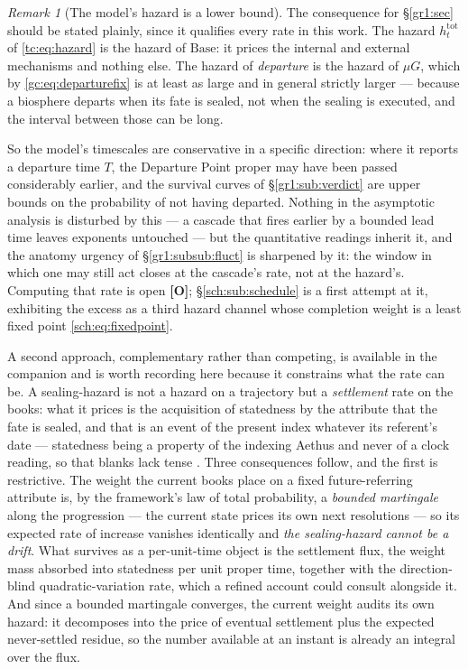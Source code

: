\documentclass[11pt]{article}
\numberwithin{equation}{section}
\theoremstyle{plain}
\theoremstyle{definition}
\theoremstyle{remark}
\newtheorem{remark}[theorem]{Remark}
\begin{document}
\begin{remark}[The model's hazard is a lower bound]
\label{gc:rem:hazardlower}
The consequence for \S\ref{gr1:sec} should be stated plainly, since it
qualifies every rate in this work. The hazard $h^{\mathrm{tot}}_t$ of
\eqref{tc:eq:hazard} is the hazard of $\mathrm{Base}$: it prices the
internal and external mechanisms and nothing else. The hazard of
\emph{departure} is the hazard of $\mu G$, which by
\eqref{gc:eq:departurefix} is at least as large and in general strictly
larger --- because a biosphere departs when its fate is sealed, not
when the sealing is executed, and the interval between those can be
long.

So the model's timescales are conservative in a specific direction:
where it reports a departure time $T$, the Departure Point proper may
have been passed considerably earlier, and the survival curves of
\S\ref{gr1:sub:verdict} are upper bounds on the probability of not
having departed. Nothing in the asymptotic analysis is disturbed by
this --- a cascade that fires earlier by a bounded lead time leaves
exponents untouched --- but the quantitative readings inherit it, and
the anatomy urgency of \S\ref{gr1:subsub:fluct} is sharpened by it: the
window in which one may still act closes at the cascade's rate, not at
the hazard's. Computing that rate is open \textbf{[O]};
\S\ref{sch:sub:schedule} is a first attempt at it, exhibiting the excess
as a third hazard channel whose completion weight is a least fixed point
\eqref{sch:eq:fixedpoint}.

A second approach, complementary rather than competing, is available in
the companion and is worth recording here because it constrains what the
rate can be. A sealing-hazard is not a hazard on a trajectory but a
\emph{settlement} rate on the books: what it prices is the acquisition of
statedness by the attribute that the fate is sealed, and that is an
event of the present index whatever its referent's date --- statedness
being a property of the indexing Aethus and never of a clock reading, so
that blanks lack tense \cite{Aethus, AethusDecision}. Three consequences follow, and the first is
restrictive. The weight the current books place on a fixed
future-referring attribute is, by the framework's law of total
probability, a \emph{bounded martingale} along the progression --- the
current state prices its own next resolutions --- so its expected rate of
increase vanishes identically and \emph{the sealing-hazard cannot be a
drift}. What survives as a per-unit-time object is the settlement flux,
the weight mass absorbed into statedness per unit proper time, together
with the direction-blind quadratic-variation rate, which a refined
account could consult alongside it. And since a bounded martingale
converges, the current weight audits its own hazard: it decomposes into
the price of eventual settlement plus the expected never-settled residue,
so the number available at an instant is already an integral over the
flux.


\end{remark}
\end{document}
